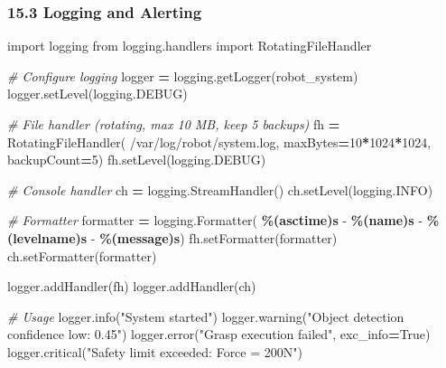 \documentclass[
]{article}
\newenvironment{Shaded}{\begin{snugshade}}{\end{snugshade}}
\newcommand{\CommentTok}[1]{\textcolor[rgb]{0.56,0.35,0.01}{\textit{#1}}}
\newcommand{\DecValTok}[1]{\textcolor[rgb]{0.00,0.00,0.81}{#1}}
\newcommand{\ImportTok}[1]{#1}
\newcommand{\NormalTok}[1]{#1}
\newcommand{\OperatorTok}[1]{\textcolor[rgb]{0.81,0.36,0.00}{\textbf{#1}}}
\newcommand{\SpecialCharTok}[1]{\textcolor[rgb]{0.81,0.36,0.00}{\textbf{#1}}}
\newcommand{\StringTok}[1]{\textcolor[rgb]{0.31,0.60,0.02}{#1}}
\newcommand{\VariableTok}[1]{\textcolor[rgb]{0.00,0.00,0.00}{#1}}
\begin{document}
\hypertarget{logging-and-alerting}{%
\subsubsection{15.3 Logging and Alerting}\label{logging-and-alerting}}

\begin{Shaded}
\begin{Highlighting}[]
\ImportTok{import}\NormalTok{ logging}
\ImportTok{from}\NormalTok{ logging.handlers }\ImportTok{import}\NormalTok{ RotatingFileHandler}

\CommentTok{\# Configure logging}
\NormalTok{logger }\OperatorTok{=}\NormalTok{ logging.getLogger(}\StringTok{\textquotesingle{}robot\_system\textquotesingle{}}\NormalTok{)}
\NormalTok{logger.setLevel(logging.DEBUG)}

\CommentTok{\# File handler (rotating, max 10 MB, keep 5 backups)}
\NormalTok{fh }\OperatorTok{=}\NormalTok{ RotatingFileHandler(}
    \StringTok{\textquotesingle{}/var/log/robot/system.log\textquotesingle{}}\NormalTok{, maxBytes}\OperatorTok{=}\DecValTok{10}\OperatorTok{*}\DecValTok{1024}\OperatorTok{*}\DecValTok{1024}\NormalTok{, backupCount}\OperatorTok{=}\DecValTok{5}\NormalTok{)}
\NormalTok{fh.setLevel(logging.DEBUG)}

\CommentTok{\# Console handler}
\NormalTok{ch }\OperatorTok{=}\NormalTok{ logging.StreamHandler()}
\NormalTok{ch.setLevel(logging.INFO)}

\CommentTok{\# Formatter}
\NormalTok{formatter }\OperatorTok{=}\NormalTok{ logging.Formatter(}
    \StringTok{\textquotesingle{}}\SpecialCharTok{\%(asctime)s}\StringTok{ {-} }\SpecialCharTok{\%(name)s}\StringTok{ {-} }\SpecialCharTok{\%(levelname)s}\StringTok{ {-} }\SpecialCharTok{\%(message)s}\StringTok{\textquotesingle{}}\NormalTok{)}
\NormalTok{fh.setFormatter(formatter)}
\NormalTok{ch.setFormatter(formatter)}

\NormalTok{logger.addHandler(fh)}
\NormalTok{logger.addHandler(ch)}

\CommentTok{\# Usage}
\NormalTok{logger.info(}\StringTok{"System started"}\NormalTok{)}
\NormalTok{logger.warning(}\StringTok{"Object detection confidence low: 0.45"}\NormalTok{)}
\NormalTok{logger.error(}\StringTok{"Grasp execution failed"}\NormalTok{, exc\_info}\OperatorTok{=}\VariableTok{True}\NormalTok{)}
\NormalTok{logger.critical(}\StringTok{"Safety limit exceeded: Force = 200N"}\NormalTok{)}
\end{Highlighting}
\end{Shaded}
\end{document}
